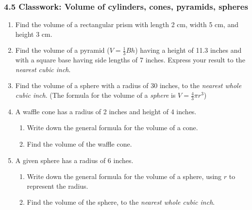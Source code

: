 

\fancyhead[LE]{\thepage}



\subsubsection*{4.5 Classwork: Volume of cylinders, cones, pyramids, spheres}
\begin{enumerate}
\item Find the volume of a rectangular prism with length 2 cm, width 5 cm, and height 3 cm. \vspace{1cm}

\item Find the volume of a pyramid ($V=\frac{1}{3}Bh$) having a height of 11.3 inches and with a square base having side lengths of 7 inches. Express your result to the \emph{nearest cubic inch}. \vspace{2cm}


\item Find the volume of a sphere with a radius of 30 inches, to the \emph{nearest whole cubic inch}. (The formula for the volume of a \emph{sphere} is $V=\frac{4}{3}\pi r^3$) \vspace{3cm}

\item A waffle cone has a radius of 2 inches and height of 4 inches. 
\begin{enumerate}
  \item Write down the general formula for the volume of a cone. \vspace{1cm}
  \item Find the volume of the waffle cone.
\end{enumerate}  \vspace{3cm}

\item A given sphere has a radius of 6 inches.
\begin{enumerate}
  \item Write down the general formula for the volume of a sphere, using $r$ to represent the radius. \vspace{1cm}
  \item Find the volume of the sphere, to the \emph{nearest whole cubic inch}.
\end{enumerate}  \vspace{3cm}


\end{enumerate}
